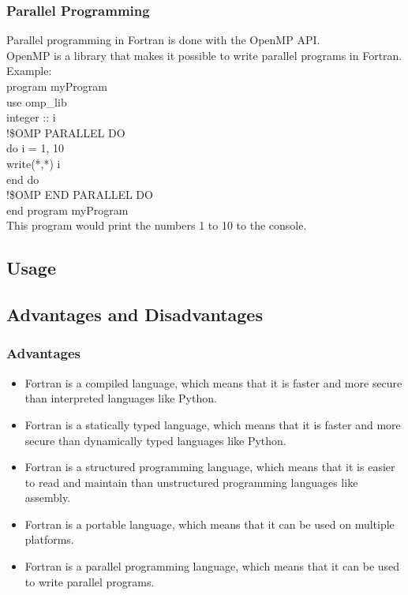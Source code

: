 \documentclass[11pt,a4paper]{scrartcl}
\begin{document}
\begin{center}
\subsubsection{Parallel Programming}
Parallel programming in Fortran is done with the OpenMP API.\\
OpenMP is a library that makes it possible to write parallel programs in Fortran.\\
Example:\\
program myProgram\\
use omp\_lib\\
integer :: i\\
!\$OMP PARALLEL DO\\
do i = 1, 10\\
write(*,*) i\\
end do\\
!\$OMP END PARALLEL DO\\
end program myProgram\\
This program would print the numbers 1 to 10 to the console.\\

\subsection{Usage}%


\subsection{Advantages and Disadvantages}
\subsubsection{Advantages}
\begin{itemize}
\item Fortran is a compiled language, which means that it is faster and more secure than interpreted languages like Python.
\item Fortran is a statically typed language, which means that it is faster and more secure than dynamically typed languages like Python.
\item Fortran is a structured programming language, which means that it is easier to read and maintain than unstructured programming languages like assembly.
\item Fortran is a portable language, which means that it can be used on multiple platforms.
\item Fortran is a parallel programming language, which means that it can be used to write parallel programs.
\end{itemize}


\end{center}
\end{document}
